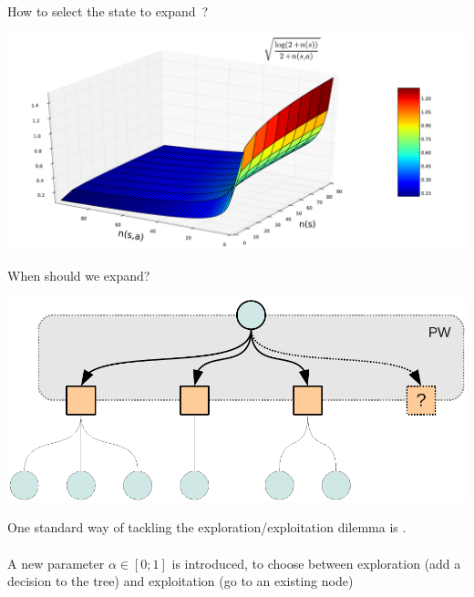 \begin{frame}{How to select the state to expand~?}
    \begin{center}
        \includegraphics[width=.90\linewidth]{fig/ucb_func2}
    \end{center}
\end{frame}


\begin{frame}{When should we expand?}
    \begin{center}
        \includegraphics[width=.40\linewidth]{fig/tree5}
    \end{center}

    One standard way of tackling the exploration/exploitation dilemma
    is \pw.\\
    ~\\
    A new parameter $\alpha \in [0 ; 1]$ is introduced, to choose between exploration (add a decision to
    the tree) and exploitation (go to an existing node)
\end{frame}


